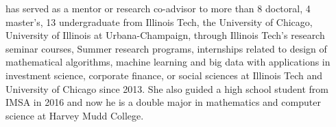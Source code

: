 has served as a mentor or research co-advisor to more than 8 doctoral, 4 master’s, 13 undergraduate from Illinois Tech, the University of Chicago, University of Illinois at Urbana-Champaign, through Illinois Tech's   research seminar courses, Summer research programs, internships related to design of mathematical algorithms, machine learning and big data with applications in investment science, corporate finance, or  social sciences at Illinois Tech and University of Chicago since 2013. 
She also guided a high school student from IMSA in 2016 and now he is a double major in mathematics and computer science at Harvey Mudd College.

